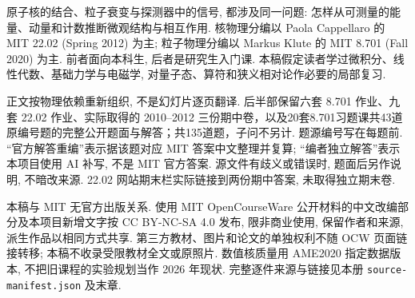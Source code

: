 \originalpreface
原子核的结合、粒子衰变与探测器中的信号, 都涉及同一问题: 怎样从可测量的能量、动量和计数推断微观结构与相互作用. 核物理分编以 Paola Cappellaro 的 MIT 22.02 (Spring 2012) 为主; 粒子物理分编以 Markus Klute 的 MIT 8.701 (Fall 2020) 为主. 前者面向本科生, 后者是研究生入门课. 本稿假定读者学过微积分、线性代数、基础力学与电磁学, 对量子态、算符和狭义相对论作必要的局部复习.

正文按物理依赖重新组织, 不是幻灯片逐页翻译. 后半部保留六套 8.701 作业、九套 22.02 作业、实际取得的 2010--2012 三份期中卷，以及20套8.701习题课共43道原编号题的完整公开题面与解答；共135道题，子问不另计. 题源编号写在每题前. ``官方解答重编''表示据该题对应 MIT 答案中文整理并复算; ``编者独立解答''表示本项目使用 AI 补写, 不是 MIT 官方答案. 源文件有歧义或错误时, 题面后另作说明, 不暗改来源. 22.02 网站期末栏实际链接到两份期中答案, 未取得独立期末卷.

本稿与 MIT 无官方出版关系. 使用 MIT OpenCourseWare 公开材料的中文改编部分及本项目新增文字按 CC BY-NC-SA 4.0 发布, 限非商业使用, 保留作者和来源, 派生作品以相同方式共享. 第三方教材、图片和论文的单独权利不随 OCW 页面链接转移; 本稿不收录受限教材全文或原照片. 数值核质量用 AME2020 指定数据版本, 不把旧课程的实验规划当作 2026 年现状. 完整逐件来源与链接见本册 \texttt{source-manifest.json} 及末章.
